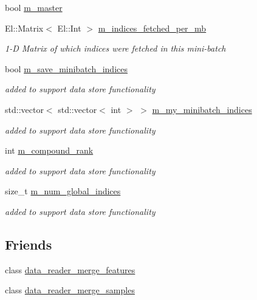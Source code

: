 \begin{DoxyCompactItemize}
bool \hyperlink{classlbann_1_1generic__data__reader_a52610681839ba81c3050c0881ffc005b}{m\+\_\+master}
\item 
El\+::\+Matrix$<$ El\+::\+Int $>$ \hyperlink{classlbann_1_1generic__data__reader_a4ee1a159c74561c15a5e0c267ad3cc6a}{m\+\_\+indices\+\_\+fetched\+\_\+per\+\_\+mb}
\begin{DoxyCompactList}\small\item\em 1-\/D Matrix of which indices were fetched in this mini-\/batch \end{DoxyCompactList}\item 
bool \hyperlink{classlbann_1_1generic__data__reader_ab1d7cac44072bd1f67291c6169414112}{m\+\_\+save\+\_\+minibatch\+\_\+indices}
\begin{DoxyCompactList}\small\item\em added to support data store functionality \end{DoxyCompactList}\item 
std\+::vector$<$ std\+::vector$<$ int $>$ $>$ \hyperlink{classlbann_1_1generic__data__reader_a5048d99a58ccddf4fb170c6face8cf4e}{m\+\_\+my\+\_\+minibatch\+\_\+indices}
\begin{DoxyCompactList}\small\item\em added to support data store functionality \end{DoxyCompactList}\item 
int \hyperlink{classlbann_1_1generic__data__reader_a7df02a1534b100df6f718dc7a7b32b25}{m\+\_\+compound\+\_\+rank}
\begin{DoxyCompactList}\small\item\em added to support data store functionality \end{DoxyCompactList}\item 
size\+\_\+t \hyperlink{classlbann_1_1generic__data__reader_ac6ea8dad1e9f0a8c939fd27d2de37e1b}{m\+\_\+num\+\_\+global\+\_\+indices}
\begin{DoxyCompactList}\small\item\em added to support data store functionality \end{DoxyCompactList}\end{DoxyCompactItemize}
\subsection*{Friends}
\begin{DoxyCompactItemize}
\item 
class \hyperlink{classlbann_1_1generic__data__reader_a084627f3f15bd7793e934c91fb99d366}{data\+\_\+reader\+\_\+merge\+\_\+features}
\item 
class \hyperlink{classlbann_1_1generic__data__reader_aaf5aed223b1f7e09e7317329d8964846}{data\+\_\+reader\+\_\+merge\+\_\+samples}
\end{DoxyCompactItemize}


